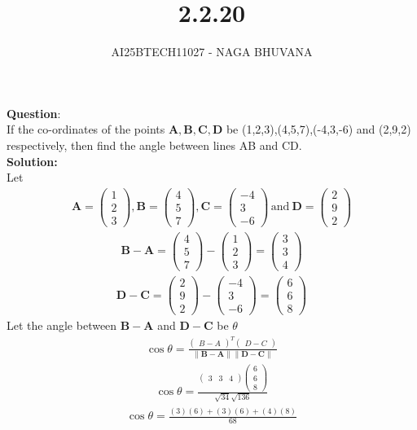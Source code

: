 \documentclass{beamer}
\title{2.2.20}
\author{AI25BTECH11027 - NAGA BHUVANA}
\theoremstyle{remark}
\newcommand{\myvec}[1]{\ensuremath{\begin{pmatrix}#1\end{pmatrix}}}
\let\vec\mathbf
\numberwithin{equation}{section}
\begin{document}
{\let\newpage\relax\maketitle}
\renewcommand{\thefigure}{\theenumi}
\renewcommand{\thetable}{\theenumi}
   \noindent
		\textbf{Question}:\\
        If the co-ordinates of the points $\vec{A},\vec{B},\vec{C},\vec{D}$ be (1,2,3),(4,5,7),(-4,3,-6) and (2,9,2) respectively, then find the angle between lines AB and CD.\\
\textbf{Solution:}\\
Let 
\begin{align}
    \vec{A}=\myvec{1\\2\\3},\vec{B}=\myvec{4\\5\\7},\vec{C}=\myvec{-4\\3\\-6} \, \text{and} \:  \vec{D}=\myvec{2\\9\\2}
\end{align}
\begin{align}
    \vec{B-A}=\myvec{4\\5\\7}-\myvec{1\\2\\3}=\myvec{3\\3\\4}
\end{align}	
\begin{align}
    \vec{D-C}=\myvec{2\\9\\2}-\myvec{-4\\3\\-6}=\myvec{6\\6\\8}
\end{align}
Let the angle between $\vec{B-A}$ and $\vec{D-C}$ be $\theta$
\begin{align}
    \cos{\theta}=\frac{\myvec{B-A}^T \myvec{D-C}}{\|\vec{B-A}\| \|\vec{D-C}\|}
\end{align}
\begin{align}
    \cos{\theta}=\frac{\myvec{3 & 3 & 4}\myvec{6\\6\\8}}{\sqrt{34}\sqrt{136}}
\end{align}
\begin{align}
    \cos{\theta}=\frac{(3)(6)+(3)(6)+(4)(8)}{68}
\end{align}
\end{document}
